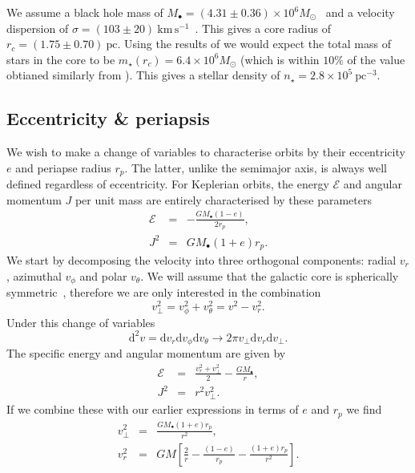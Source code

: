 \documentclass[useAMS,usedcolumn,usegraphicx,usenatbib]{mn2e}
\newcommand{\units}[1]{\ensuremath{~\mathrm{#1}}}
\newcommand{\dd}{\ensuremath{\mathrm{d}}}
\begin{document}
We assume a black hole mass of $M_\bullet = (4.31 \pm 0.36) \times 10^6 M_\odot$~\cite{Gillessen2009} and a velocity dispersion of $\sigma = (103 \pm 20)\units{km\,s^{-1}}$~\cite{Tremaine2002}. This gives a core radius of $r_c = (1.75 \pm 0.70)\units{pc}$. Using the results of \citet{Ghez2008} we would expect the total mass of stars in the core to be $m_\star(r_c) = 6.4 \times 10^6 M_\odot$ (which is within $10\%$ of the value obtianed similarly from \citet{Genzel2003}). This gives a stellar density of $n_\star = 2.8 \times 10^5\units{pc^{-3}}$.

\subsection{Eccentricity \& periapsis}

We wish to make a change of variables to characterise orbits by their eccentricity $e$ and periapse radius $r_p$. The latter, unlike the semimajor axis, is always well defined regardless of eccentricity. For Keplerian orbits, the energy $\mathcal{E}$ and angular momentum $J$ per unit mass are entirely characterised by these parameters
\begin{eqnarray}
\mathcal{E} & = & -\frac{GM_\bullet(1 - e)}{2r_p},\\
J^2 & = & GM_\bullet(1 + e)r_p.
\end{eqnarray}
We start by decomposing the velocity into three orthogonal components: radial $v_r$, azimuthal $v_\phi$ and polar $v_\theta$. We will assume that the galactic core is spherically symmetric~\citep{Genzel2003, Schodel2007}, therefore we are only interested in the combination
\begin{equation}
v_\perp^2 = v_\phi^2 + v_\theta^2 = v^2 - v_r^2.
\end{equation}
Under this change of variables
\begin{equation}
\dd^2v = \dd v_r \dd v_\phi \dd v_\theta \rightarrow 2\pi v_\perp \dd v_r \dd v_\perp.
\end{equation}
The specific energy and angular momentum are given by
\begin{eqnarray}
\mathcal{E} & = & \frac{v_r^2 + v_\perp^2}{2} - \frac{GM_\bullet}{r},\\
J^2 & = & r^2 v_\perp^2.
\end{eqnarray}
If we combine these with our earlier expressions in terms of $e$ and $r_p$ we find
\begin{eqnarray}
v_\perp^2 & = & \frac{GM_\bullet(1 + e)r_p}{r^2},\\
v_r^2 & = & GM\left[\frac{2}{r} - \frac{(1 - e)}{r_p} - \frac{(1 + e)r_p}{r^2}\right].
\end{eqnarray}
\end{document}
